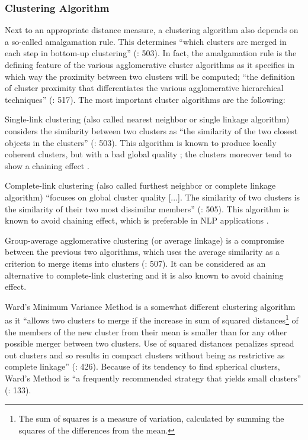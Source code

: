 \subsubsection{\label{sec:3.7.2.2}  Clustering Algorithm}

Next to an appropriate distance measure, a clustering algorithm also depends on a so-called amalgamation rule. This determines “which clusters are merged in each step in bottom-up clustering” (\citealt{manning_foundations_1999}: 503). In fact, the amalgamation rule is the defining feature of the various agglomerative cluster algorithms as it specifies in which way the proximity between two clusters will be computed; “the definition of cluster proximity that differentiates the various agglomerative hierarchical techniques” (\citealt{tan_introduction_2006}: 517). The most important cluster algorithms are the following:



Single-link clustering (also called nearest neighbor or single linkage algorithm) considers the similarity between two clusters as “the similarity of the two closest objects in the clusters” (\citealt{manning_foundations_1999}: 503). This algorithm is known to produce locally coherent clusters, but with a bad global quality \citep[503]{manning_foundations_1999}; the clusters moreover tend to show a chaining effect \citep[504]{manning_foundations_1999}.



Complete-link clustering (also called furthest neighbor or complete linkage algorithm) “focuses on global cluster quality [...]. The similarity of two clusters is the similarity of their two most dissimilar members” (\citealt{manning_foundations_1999}: 505). This algorithm is known to avoid chaining effect, which is preferable in NLP applications \citep[506]{manning_foundations_1999}.



Group-average agglomerative clustering (or average linkage) is a compromise between the previous two algorithms, which uses the average similarity as a criterion to merge items into clusters (\citealt{manning_foundations_1999}: 507). It can be considered as an alternative to complete-link clustering and it is also known to avoid chaining effect.



Ward’s Minimum Variance Method is a somewhat different clustering algorithm as it “allows two clusters to merge if the increase in sum of squared distances\footnote{The sum of squares is a measure of variation, calculated by summing the squares of the differences from the mean.} of the members of the new cluster from their mean is smaller than for any other possible merger between two clusters. Use of squared distances penalizes spread out clusters and so results in compact clusters without being as restrictive as complete linkage” (\citealt{glynn_cluster_2014}: 426). Because of its tendency to find spherical clusters, Ward’s Method is “a frequently recommended strategy that yields small clusters” (\citealt{divjak_structuring_2010}: 133).



